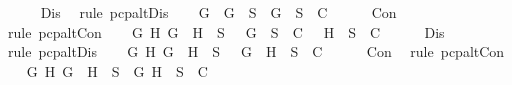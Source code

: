 \begin{isabellebody}
\ \ \ \ \isamarkupfalse%
\ Dis\ \isamarkupfalse%
\ {\isacharparenleft}rule\ pcp{\isacharunderscore}alt{}Dis{}{\isacharparenright}\isanewline
\ \ \isamarkupfalse%
\ {}{\isacharcolon}{\isachardoublequoteopen}{\isasymforall}G{\isachardot}\ \isactrlbold {\isasymnot}\ {\isacharparenleft}\isactrlbold {\isasymnot}G{\isacharparenright}\ {\isasymin}\ S\ {\isasymlongrightarrow}\ {\isacharbraceleft}G{\isacharbraceright}\ {\isasymunion}\ S\ {\isasymin}\ C{\isachardoublequoteclose}\isanewline
\ \ \ \ \isamarkupfalse%
\ Con\ \isamarkupfalse%
\ {\isacharparenleft}rule\ pcp{\isacharunderscore}alt{}Con{}{\isacharparenright}\isanewline
\ \ \isamarkupfalse%
\ {}{\isacharcolon}{\isachardoublequoteopen}{\isasymforall}G\ H{\isachardot}\ \isactrlbold {\isasymnot}{\isacharparenleft}G\ \isactrlbold {\isasymand}\ H{\isacharparenright}\ {\isasymin}\ S\ {\isasymlongrightarrow}\ {\isacharbraceleft}\isactrlbold {\isasymnot}\ G{\isacharbraceright}\ {\isasymunion}\ S\ {\isasymin}\ C\ {\isasymor}\ {\isacharbraceleft}\isactrlbold {\isasymnot}\ H{\isacharbraceright}\ {\isasymunion}\ S\ {\isasymin}\ C{\isachardoublequoteclose}\isanewline
\ \ \ \ \isamarkupfalse%
\ Dis\ \isamarkupfalse%
\ {\isacharparenleft}rule\ pcp{\isacharunderscore}alt{}Dis{}{\isacharparenright}\isanewline
\ \ \isamarkupfalse%
\ {}{\isacharcolon}{\isachardoublequoteopen}{\isasymforall}G\ H{\isachardot}\ \isactrlbold {\isasymnot}{\isacharparenleft}G\ \isactrlbold {\isasymor}\ H{\isacharparenright}\ {\isasymin}\ S\ {\isasymlongrightarrow}\ {\isacharbraceleft}\isactrlbold {\isasymnot}\ G{\isacharcomma}\ \isactrlbold {\isasymnot}\ H{\isacharbraceright}\ {\isasymunion}\ S\ {\isasymin}\ C{\isachardoublequoteclose}\isanewline
\ \ \ \ \isamarkupfalse%
\ Con\ \isamarkupfalse%
\ {\isacharparenleft}rule\ pcp{\isacharunderscore}alt{}Con{}{\isacharparenright}\isanewline
\ \ \isamarkupfalse%
\ {}{\isacharcolon}{\isachardoublequoteopen}{\isasymforall}G\ H{\isachardot}\ \isactrlbold {\isasymnot}{\isacharparenleft}G\ \isactrlbold {\isasymrightarrow}\ H{\isacharparenright}\ {\isasymin}\ S\ {\isasymlongrightarrow}\ {\isacharbraceleft}G{\isacharcomma}\isactrlbold {\isasymnot}\ H{\isacharbraceright}\ {\isasymunion}\ S\ {\isasymin}\ C{\isachardoublequoteclose}\isanewline
\ \ \ \ \isamarkupfalse%

\end{isabellebody}
